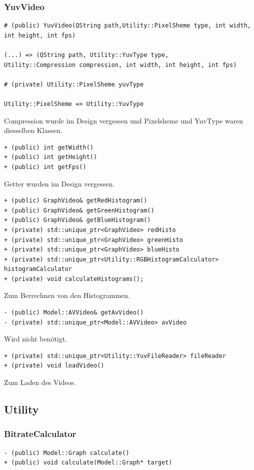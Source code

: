 \documentclass{scrartcl}
\begin{document}
{\subsubsection{YuvVideo}
\bigskip
\begin{verbatim}
# (public) YuvVideo(QString path,Utility::PixelSheme type, int width, int height, int fps)

(...) => (QString path, Utility::YuvType type, 
Utility::Compression compression, int width, int height, int fps)

# (private) Utility::PixelSheme yuvType

Utility::PixelSheme => Utility::YuvType
\end{verbatim}
Compression wurde im Design vergessen und Pixelsheme und YuvType waren diesselben Klassen.
\bigskip
\begin{verbatim}
+ (public) int getWidth()
+ (public) int getHeight()
+ (public) int getFps()
\end{verbatim}
Getter wurden im Design vergessen.
\bigskip
\begin{verbatim}
+ (public) GraphVideo& getRedHistogram()
+ (public) GraphVideo& getGreenHistogram()
+ (public) GraphVideo& getBlueHistogram()
+ (private) std::unique_ptr<GraphVideo> redHisto
+ (private) std::unique_ptr<GraphVideo> greenHisto
+ (private) std::unique_ptr<GraphVideo> blueHisto
+ (private) std::unique_ptr<Utility::RGBHistogramCalculator> histogramCalculator
+ (private) void calculateHistograms();
\end{verbatim}
Zum Berrechnen von den Histogrammen.
\bigskip
\begin{verbatim}
- (public) Model::AVVideo& getAvVideo()
- (private) std::unique_ptr<Model::AVVideo> avVideo
\end{verbatim}
Wird nicht benötigt.
\bigskip
\begin{verbatim}
+ (private) std::unique_ptr<Utility::YuvFileReader> fileReader
+ (private) void loadVideo()
\end{verbatim}
Zum Laden des Videos.
\newpage
\subsection{Utility}
\subsubsection{BitrateCalculator}
\begin{verbatim}
- (public) Model::Graph calculate()
+ (public) void calculate(Model::Graph* target)


\end{verbatim}}
\end{document}
